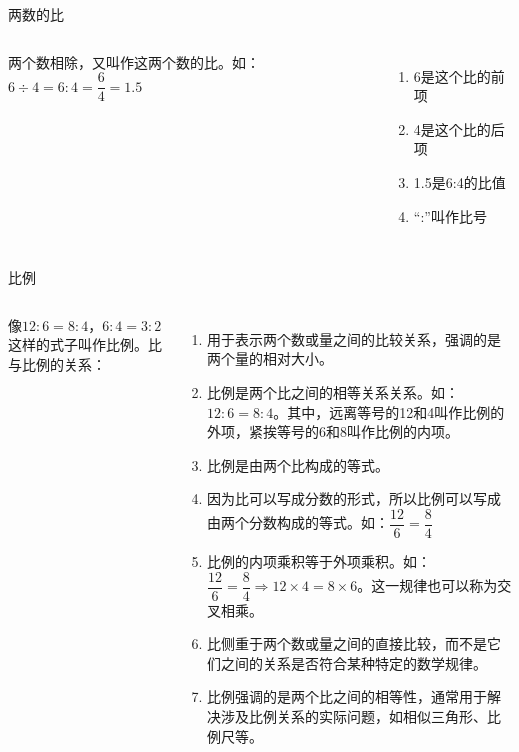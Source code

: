 \documentclass[aspectratio=169]{ctexbeamer} %
\date{\today}
\begin{document}
\begin{frame}[t]{两数的比}
\begin{columns}
两个数相除，又叫作这两个数的比。如：$6 \div 4 = 6 : 4 = \dfrac{6}{4}= 1.5$
\begin{enumerate}[label={(\arabic*).}]
\item 6是这个比的前项
\item 4是这个比的后项
\item 1.5是6:4的比值
\item “:”叫作比号
\end{enumerate}
\end{columns}
\end{frame}

\begin{frame}[t]{比例}
\begin{columns}
像$12 : 6= 8 : 4$，$6 : 4 = 3 : 2$这样的式子叫作比例。比与比例的关系：
\begin{enumerate}[label={(\arabic*).}]
\item  \alert{用于表示两个数或量之间的比较关系，强调的是两个量的相对大小。}
\item 比例是两个比之间的相等关系关系。如：$12 : 6 = 8 : 4$。其中，远离等号的12和4叫作比例的外项，紧挨等号的6和8叫作比例的内项。
\item \alert{比例是由两个比构成的等式。}
\item 因为比可以写成分数的形式，所以比例可以写成由两个分数构成的等式。如：$\dfrac{12}{6} = \dfrac{8}{4}$
\item  \alert{比例的内项乘积等于外项乘积。如：$\dfrac{12}{6} = \dfrac{8}{4} \Rightarrow 12 \times 4 = 8 \times 6$。这一规律也可以称为交叉相乘。}
\item 比侧重于两个数或量之间的直接比较，而不是它们之间的关系是否符合某种特定的数学规律。
\item  \alert{比例强调的是两个比之间的相等性，通常用于解决涉及比例关系的实际问题，如相似三角形、比例尺等。}
\end{enumerate}
\end{columns}
\end{frame}
\end{document}
